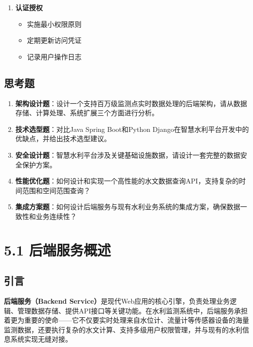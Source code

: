 \begin{enumerate}
\begin{itemize}
\end{itemize} \item \textbf{认证授权} \begin{itemize} \tightlist \item 实施最小权限原则 \item 定期更新访问凭证 \item 记录用户操作日志 \end{itemize}
\end{enumerate} \subsection{思考题}\label{ux601dux8003ux9898} \begin{enumerate} \def\labelenumi{\arabic{enumi}.} \item
\textbf{架构设计题}：设计一个支持百万级监测点实时数据处理的后端架构，请从数据存储、计算处理、系统扩展三个方面进行分析。 \item \textbf{技术选型题}：对比Java Spring Boot和Python
Django在智慧水利平台开发中的优缺点，并给出技术选型建议。 \item \textbf{安全设计题}：智慧水利平台涉及关键基础设施数据，请设计一套完整的数据安全保护方案。 \item
\textbf{性能优化题}：如何设计和实现一个高性能的水文数据查询API，支持复杂的时间范围和空间范围查询？ \item \textbf{集成方案题}：如何设计后端服务与现有水利业务系统的集成方案，确保数据一致性和业务连续性？
\end{enumerate} \section{5.1 后端服务概述}\label{ux540eux7aefux670dux52a1ux6982ux8ff0} \learningobjectives{
}\subsection{引言}\label{ux5f15ux8a00-1} \textbf{后端服务（Backend
Service）}是现代Web应用的核心引擎，负责处理业务逻辑、管理数据存储、提供API接口等关键功能。在水利监测系统中，后端服务承担着更为重要的使命------它不仅要实时处理来自水位计、流量计等传感器设备的海量监测数据，还要执行复杂的水文计算、支持多级用户权限管理，并与现有的水利信息系统实现无缝对接。
